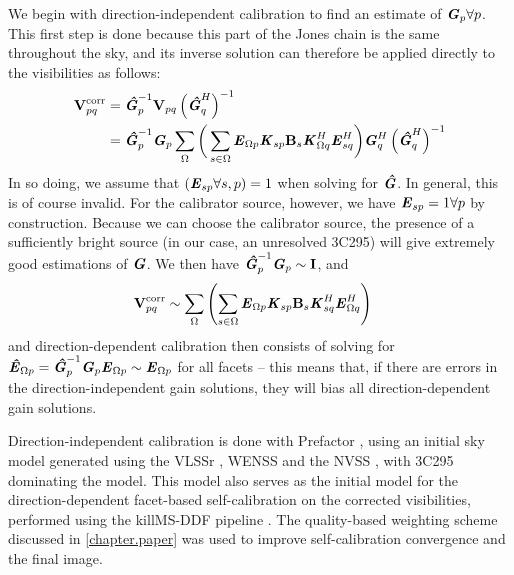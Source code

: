 \pg
We begin with direction-independent calibration to find an estimate of $\textbf{\emph{G}}_p\forall p$. This first step is done because this part of the Jones chain is the same throughout the sky, and its inverse solution can therefore be applied directly to the visibilities as follows:
\begin{align}
\textbf{V}_{pq}^\mathrm{corr} &= \textbf{\emph{\^{G}}}_p^{-1} \textbf{V}_{pq} \left( \textbf{\emph{\^{G}}}_q^H \right)^{-1}\\
						&= \textbf{\emph{\^{G}}}_p^{-1}\textbf{\emph{G}}_p \sum_{\Omega}\bigg( \sum_{s\in\Omega} \textbf{\emph{E}}_{\Omega p} \textbf{\emph{K}}_{sp} \textbf{B}_{s} \textbf{\emph{K}}_{\Omega q}^H \textbf{\emph{E}}_{sq}^H \bigg) \textbf{\emph{G}}_q^H \left( \textbf{\emph{\^{G}}}_q^H \right)^{-1}
\end{align}
In so doing, we assume that $\left(\textbf{\emph{E}}_{sp}\forall s,p\right) =1$ when solving for $\textbf{\emph{\^{G}}}$. In general, this is of course invalid. For the calibrator source, however, we have $\textbf{\emph{E}}_{sp} =1 \forall p$ by construction. Because we can choose the calibrator source, the presence of a sufficiently bright source (in our case, an unresolved 3C295) will give extremely good estimations of $\textbf{\emph{G}}$. We then have $\textbf{\emph{\^{G}}}_p^{-1}\textbf{\emph{G}}_p\sim \bm{\mathrm{I}}$, and
\begin{align}
\textbf{V}_{pq}^\mathrm{corr} &\sim \sum_{\Omega}\left( \sum_{s\in\Omega} \textbf{\emph{E}}_{\Omega p} \textbf{\emph{K}}_{sp} \textbf{B}_{s} \textbf{\emph{K}}_{sq}^H \textbf{\emph{E}}_{\Omega q}^H \right)\label{eq.vcorr}
\end{align}
and direction-dependent calibration then consists of solving for $\textbf{\emph{\^{E}}}_{\Omega p} = \textbf{\emph{\^{G}}}_p^{-1}\textbf{\emph{G}}_p\textbf{\emph{E}}_{\Omega p} \sim \textbf{\emph{E}}_{\Omega p}$ for all facets -- this means that, if there are errors in the direction-independent gain solutions, they will bias all direction-dependent gain solutions.

\pg
Direction-independent calibration is done with Prefactor , using an initial sky model generated using the VLSSr , WENSS  and the NVSS , with 3C295 dominating the model. This model also serves as the initial model for the direction-dependent facet-based self-calibration on the corrected visibilities, performed using the killMS-DDF pipeline . The quality-based weighting scheme discussed in \cref{chapter.paper} was used to improve self-calibration convergence and the final image.

